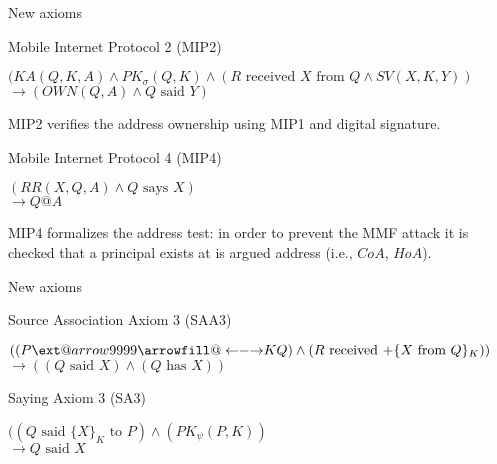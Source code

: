 \documentclass[10pt]{beamer}
\makeatletter
\newcommand\xleftrightarrow[2][]{%
  \ext@arrow 9999{\longleftrightarrowfill@}{#1}{#2}}
\newcommand\longleftrightarrowfill@{%
  \arrowfill@\leftarrow\relbar\rightarrow}
\newcommand{\xtext}[1]{\text{ #1 }}
\makeatother
\begin{document}
\begin{frame}{New axioms}
	\begin{block}{Mobile Internet Protocol 2 (MIP2)}
		{\centering
		$(KA(Q,K,A) \land PK_\sigma(Q,K) \land (R \xtext{received} X \xtext{from} Q \land SV(X,K,Y))$
		\\$\rightarrow (OWN(Q,A)\land Q \xtext{said} Y)$\par}
		MIP2 verifies the address ownership using MIP1 and digital signature.
	\end{block}
	\vspace{0.5cm}
	\begin{block}{Mobile Internet Protocol 4 (MIP4)}
		{\centering
		$(RR(X,Q,A) \land Q \xtext{says} X)$
		\\$\rightarrow Q@A$\par}
		MIP4 formalizes the address test: in order to prevent the MMF attack it is checked that a principal exists at is argued address (i.e., $CoA$, $HoA$).
	\end{block}
\end{frame}
\iffalse
\begin{frame}{New axioms}
	\begin{block}{Mobile Internet Protocol 3 (MIP3)}
		{\centering
		$(KA(Q,K,A) \land PK_\psi(Q,K) \land Q \xtext{says} X \land EV(X,K,Q)$
		\\$\rightarrow OWN(Q,A)$\par}
		MIP1 formalizes the public key verification through, for example, CGA parameters.
	\end{block}
\end{frame}
\begin{frame}{New axioms}
	\begin{block}{Mobile Internet Protocol 4 (MIP4)}
		{\centering
		$(RR(X,Q,A) \land Q \xtext{says} X)$
		\\$\rightarrow Q@A$\par}
		MIP4 formalizes the address test in order to prevent the MMF attack.
	\end{block}
\end{frame}
\fi
\begin{frame}{New axioms}
	\begin{block}{Source Association Axiom 3 (SAA3)}
		{\centering
		$((P \xleftrightarrow{K}Q) \land (R \xtext{received} {+}\{X \xtext{from} Q\}_K))$
		\\$\rightarrow ((Q \xtext{said} X) \land (Q \xtext{has} X))$\par}
	\end{block}
	\vspace{0.5cm}
	\begin{block}{Saying Axiom 3 (SA3)}
		{\centering
		$((Q \xtext{said}\{X\}_K \xtext{to} P) \land (PK_\psi(P,K))$
		\\$\rightarrow Q \xtext{said} X$\par}
	\end{block}
\end{frame}
\end{document}

